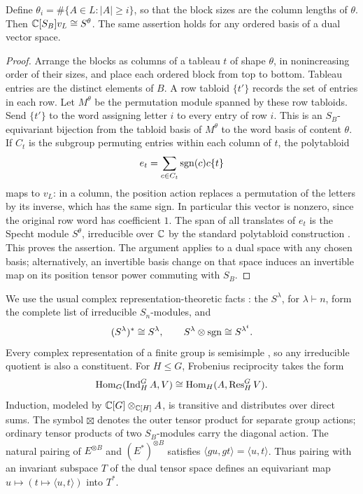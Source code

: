\begin{lemma}\label{lem:polytabloid}
Define $\theta_i=\#\{A\in L:|A|\ge i\}$, so that the block sizes are
the column lengths of $\theta$.  Then
$\mathbb C[S_B]v_L\cong S^\theta$.
The same assertion holds for any ordered basis of a dual vector space.
\end{lemma}

\begin{proof}
Arrange the blocks as columns of a tableau $t$ of shape $\theta$, in
nonincreasing order of their sizes, and place each ordered block from top
to bottom.  Tableau entries are the distinct elements of $B$.
A row tabloid $\{t'\}$ records the set of entries in each row.
Let $M^\theta$ be the permutation module spanned by these row tabloids.
Send $\{t'\}$ to
the word assigning letter $i$ to every entry of row $i$.
This is an $S_B$-equivariant bijection from the tabloid basis of
$M^\theta$ to the word basis of content $\theta$.
If $C_t$ is the subgroup permuting entries within each column of $t$,
the polytabloid
\[
 e_t=\sum_{c\in C_t}\operatorname{sgn}(c)c\{t\}
\]
maps to $v_L$: in a column, the position action replaces a permutation
of the letters by its inverse, which has the same sign.
In particular this vector is nonzero, since the original row word has
coefficient $1$.  The span of all translates of $e_t$ is the Specht
module $S^\theta$, irreducible over $\mathbb C$ by the standard polytabloid
construction \cite[Definitions~4.1 and~4.3, Theorem~4.12]{james1978}.
This proves the assertion.
The argument applies to a dual space with any chosen basis; alternatively,
an invertible basis change on that space induces an invertible map on
its position tensor power commuting with $S_B$.
\end{proof}

We use the usual complex representation-theoretic facts
\cite[Theorems~4.12 and~6.7]{james1978}: the $S^\lambda$, for
$\lambda\vdash n$, form the complete list of irreducible $S_n$-modules,
and
\begin{equation}\label{tools:dual-sign}
 (S^\lambda)^*\cong S^\lambda,
 \qquad S^\lambda\otimes\operatorname{sgn}\cong S^{\lambda^t}.
\end{equation}
Every complex representation of a finite group is semisimple
\cite[Proposition~1.5 and Corollary~1.6]{fultonharris1991}, so any
irreducible quotient is also a constituent.  For $H\le G$,
Frobenius reciprocity \cite[Proposition~3.17]{fultonharris1991}
takes the form
\begin{equation}\label{tools:frobenius}
 \operatorname{Hom}_G(\operatorname{Ind}_H^G A,V)
 \cong\operatorname{Hom}_H(A,\operatorname{Res}_H^G V).
\end{equation}
Induction, modeled by $\mathbb C[G]\otimes_{\mathbb C[H]}A$, is transitive and
distributes over direct sums.  The symbol
$\boxtimes$ denotes the outer tensor product for separate group actions;
ordinary tensor products of two $S_B$-modules carry the diagonal action.
The natural pairing of $E^{\otimes B}$ and $(E^*)^{\otimes B}$ satisfies
$\langle gu,gt\rangle=\langle u,t\rangle$.
Thus pairing with an invariant subspace $T$ of the dual tensor space
defines an equivariant map $u\mapsto(t\mapsto\langle u,t\rangle)$
into $T^*$.

